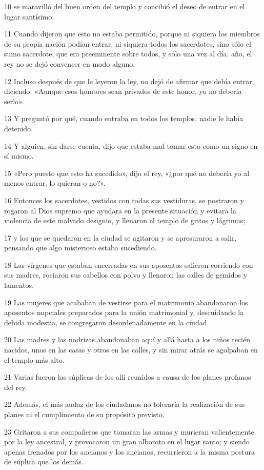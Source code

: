 \par 10 se maravilló del buen orden del templo y concibió el deseo de entrar en el lugar santísimo.
\par 11 Cuando dijeron que esto no estaba permitido, porque ni siquiera los miembros de su propia nación podían entrar, ni siquiera todos los sacerdotes, sino sólo el sumo sacerdote, que era preeminente sobre todos, y sólo una vez al día. año, el rey no se dejó convencer en modo alguno.
\par 12 Incluso después de que le leyeron la ley, no dejó de afirmar que debía entrar, diciendo: «Aunque esos hombres sean privados de este honor, yo no debería serlo».
\par 13 Y preguntó por qué, cuando entraba en todos los templos, nadie le había detenido.
\par 14 Y alguien, sin darse cuenta, dijo que estaba mal tomar esto como un signo en sí mismo.
\par 15 «Pero puesto que esto ha sucedido», dijo el rey, «¿por qué no debería yo al menos entrar, lo quieran o no?».
\par 16 Entonces los sacerdotes, vestidos con todas sus vestiduras, se postraron y rogaron al Dios supremo que ayudara en la presente situación y evitara la violencia de este malvado designio, y llenaron el templo de gritos y lágrimas;
\par 17 y los que se quedaron en la ciudad se agitaron y se apresuraron a salir, pensando que algo misterioso estaba sucediendo.
\par 18 Las vírgenes que estaban encerradas en sus aposentos salieron corriendo con sus madres, rociaron sus cabellos con polvo y llenaron las calles de gemidos y lamentos.
\par 19 Las mujeres que acababan de vestirse para el matrimonio abandonaron los aposentos nupciales preparados para la unión matrimonial y, descuidando la debida modestia, se congregaron desordenadamente en la ciudad.
\par 20 Las madres y las nodrizas abandonaban aquí y allá hasta a los niños recién nacidos, unos en las casas y otros en las calles, y sin mirar atrás se agolpaban en el templo más alto.
\par 21 Varias fueron las súplicas de los allí reunidos a causa de los planes profanos del rey.
\par 22 Además, el más audaz de los ciudadanos no toleraría la realización de sus planes ni el cumplimiento de su propósito previsto.
\par 23 Gritaron a sus compañeros que tomaran las armas y murieran valientemente por la ley ancestral, y provocaron un gran alboroto en el lugar santo; y siendo apenas frenados por los ancianos y los ancianos, recurrieron a la misma postura de súplica que los demás.
